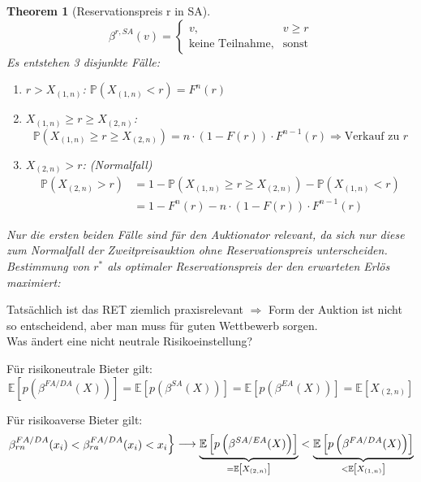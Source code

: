 \documentclass[12pt]{extreport} %
\theoremstyle{named}
\newtheorem{unnamedtheorem}{Theorem} \counterwithin{unnamedtheorem}{chapter}
\theoremstyle{nnamed}
\theoremstyle{itshape}
\theoremstyle{normal}
\begin{document}
\begin{unnamedtheorem}[Reservationspreis r in SA]
	$$ \beta^{r, SA}(v) = \begin{cases} v, & v \geq r \\ \text{keine Teilnahme}, & \text{sonst} \end{cases} $$
	Es entstehen 3 disjunkte Fälle:
	\begin{enumerate}
		\item $r > X_{(1, n)}$: $\mathbb{P}\left( X_{(1,n)} < r \right) = F^{n}(r)$
		\item $X_{(1,n)} \geq r \geq X_{(2,n)}$: $$\mathbb{P}\left( X_{(1,n)} \geq r \geq X_{(2, n)} \right) = n \cdot \left(1-F(r) \right) \cdot F^{n-1}(r) \Rightarrow \text{Verkauf zu } r$$
		\item $X_{(2,n)} > r$: (Normalfall)
			\begin{align*}
				\mathbb{P}\left( X_{(2,n)} > r \right) & = 1 - \mathbb{P}\left( X_{(1,n)} \geq r \geq X_{(2,n)} \right) - \mathbb{P} \left( X_{(1,n)} < r \right) \\
				& = 1 - F^{n}(r) - n \cdot \left( 1 - F(r) \right) \cdot F^{n-1}(r)
			\end{align*}
	\end{enumerate}
	Nur die ersten beiden Fälle sind für den Auktionator relevant, da sich nur diese zum Normalfall der Zweitpreisauktion ohne Reservationspreis unterscheiden. ~\\
	
	Bestimmung von $r^{*}$ als optimaler Reservationspreis der den erwarteten Erlös maximiert:
\end{unnamedtheorem}

Tatsächlich ist das RET ziemlich praxisrelevant $\Rightarrow$ Form der Auktion ist nicht so entscheidend, aber man muss für guten Wettbewerb sorgen. \\ 

Was ändert eine nicht neutrale Risikoeinstellung? ~\\

\begin{description}
	\item Für risikoneutrale Bieter gilt:
		$$ \mathbb{E} \left[ p\left( \beta^{FA/DA}(X) \right) \right] = \mathbb{E} \left[ p\left( \beta^{SA}(X) \right) \right] = \mathbb{E} \left[ p\left( \beta^{EA}(X) \right) \right] = \mathbb{E} \left[ X_{(2,n)} \right]  $$
	\item Für risikoaverse Bieter gilt:
		$$ \begin{rcases} \beta_{rn}^{FA/DA}(x_{i}) < \beta_{ra}^{FA/DA}(x_{i}) < x_{i} \end{rcases} \longrightarrow  \underbrace{\mathbb{E}\left[ p \left( \beta^{SA/EA}(X) \right) \right]}_{= \mathbb{E}\left[ X_{(2,n)} \right]} < \underbrace{\mathbb{E}\left[ p \left( \beta^{FA/DA}(X) \right) \right]}_{< \mathbb{E}\left[ X_{(1,n)} \right]}$$
\end{description} 
\end{document}
